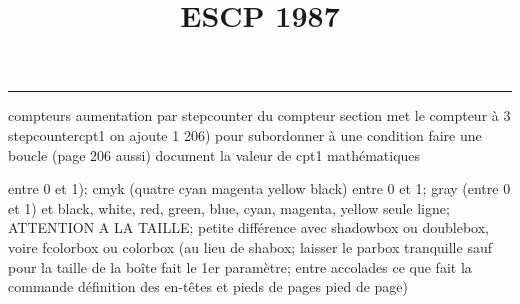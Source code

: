 \documentclass[11pt]{article}%
\title{\bf \vspace{-2cm} ESCP 1987} %
\author{} %
\date{} %
\renewcommand{\headrulewidth}{0pt}%
\renewcommand{\footrulewidth}{0.4pt}%
\begin{document}
\maketitle %
\vspace{-1.4cm}\hrule %
\thispagestyle{fancy}

\vspace*{.2cm}



compteurs%
aumentation par stepcounter du compteur section%
met le compteur à 3%
stepcounter{cpt1} on ajoute 1%
206) pour subordonner à une condition %
faire une boucle (page 206 aussi) %
document la valeur de cpt1 
mathématiques\newcommand{\ch}{\operatorname{ch}} 
\newcommand{\sh}{\operatorname{sh}}
\renewcommand{\tanh}{\operatorname{th}}
\renewcommand{\sinh}{\operatorname{sh}}
\renewcommand{\cosh}{\operatorname{ch}}
\newcommand{\argsh}{\operatorname{argsh}}
\newcommand{\argch}{\operatorname{argch}}
\newcommand{\argth}{\operatorname{argth}}
\newcommand{\ker}{\operatorname{Ker}}
\renewcommand{\im}{\operatorname{Im}}
\newcommand{\rg}{\operatorname{rg}}
\newcommand{\Id}{\operatorname{Id}}
\newcommand{\id}{\operatorname{id}}
\renewcommand{\leq}{\leq}
\renewcommand{\geq}{\geq }

entre 0 et 1); cmyk (quatre cyan magenta yellow black) entre 0 et 1;
gray (entre 0 et 1) et black, white, red, green, blue, cyan, magenta,
yellow%
seule ligne; ATTENTION A LA TAILLE; petite différence avec shadowbox ou
doublebox, voire fcolorbox ou colorbox (au lieu de shabox; laisser le
parbox tranquille sauf pour la taille de la boîte
\newcommand{\Tbox}[1]{\begin{center} \shabox{\parbox{0.6
\linewidth}{#1}} \end{center}} %
fait le 1er paramètre; entre accolades ce que fait la commande
définition des en-têtes et pieds de pages\pagestyle{fancy}
\chead{}
\rfoot[ \ \thepage]{\thepage}
\cfoot{}
\lfoot{}
\thispagestyle{fancy} %
pied de page)\renewcommand{\footrulewidth}{0.4pt}
\renewcommand{\headrulewidth}{0.4pt}
\end{document}
